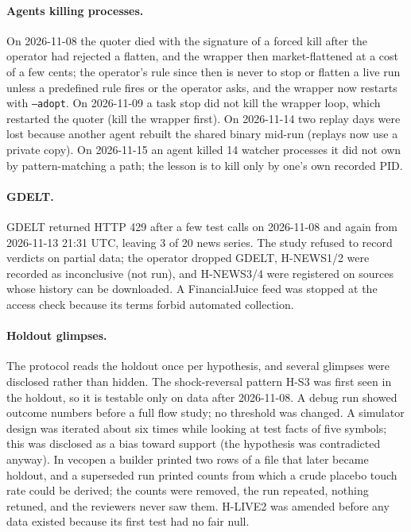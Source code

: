 \documentclass[10pt,a4paper]{article}
\newcommand{\hyp}[1]{\textsf{#1}}
\begin{document}
\paragraph{Agents killing processes.} On 2026-11-08 the quoter died with the signature of a forced kill after the operator had rejected a flatten, and the wrapper then market-flattened at a cost of a few cents; the operator's rule since then is never to stop or flatten a live run unless a predefined rule fires or the operator asks, and the wrapper now restarts with \texttt{--adopt}. On 2026-11-09 a task stop did not kill the wrapper loop, which restarted the quoter (kill the wrapper first). On 2026-11-14 two replay days were lost because another agent rebuilt the shared binary mid-run (replays now use a private copy). On 2026-11-15 an agent killed 14 watcher processes it did not own by pattern-matching a path; the lesson is to kill only by one's own recorded PID.

\paragraph{GDELT.} GDELT returned HTTP 429 after a few test calls on 2026-11-08 and again from 2026-11-13 21:31 UTC, leaving 3 of 20 news series. The study refused to record verdicts on partial data; the operator dropped GDELT, \hyp{H-NEWS1/2} were recorded as inconclusive (not run), and \hyp{H-NEWS3/4} were registered on sources whose history can be downloaded. A FinancialJuice feed was stopped at the access check because its terms forbid automated collection.

\paragraph{Holdout glimpses.} The protocol reads the holdout once per hypothesis, and several glimpses were disclosed rather than hidden. The shock-reversal pattern \hyp{H-S3} was first seen in the holdout, so it is testable only on data after 2026-11-08. A debug run showed outcome numbers before a full flow study; no threshold was changed. A simulator design was iterated about six times while looking at test facts of five symbols; this was disclosed as a bias toward support (the hypothesis was contradicted anyway). In vecopen a builder printed two rows of a file that later became holdout, and a superseded run printed counts from which a crude placebo touch rate could be derived; the counts were removed, the run repeated, nothing retuned, and the reviewers never saw them. \hyp{H-LIVE2} was amended before any data existed because its first test had no fair null.
\end{document}
